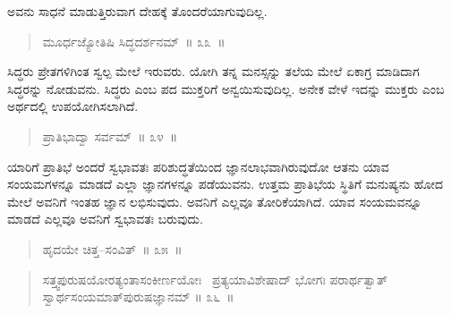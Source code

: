 
\vspace{0.1cm}

ಅವನು ಸಾಧನೆ ಮಾಡುತ್ತಿರುವಾಗ ದೇಹಕ್ಕೆ ತೊಂದರೆಯಾಗುವುದಿಲ್ಲ. 

\vspace{-0.2cm}

\begin{verse}
ಮೂರ್ಧಜ್ಯೋತಿಷಿ ಸಿದ್ಧದರ್ಶನಮ್​~॥ ೩೩~॥
\end{verse}

\vspace{-0.4cm}


\vspace{0.1cm}

ಸಿದ್ಧರು ಪ್ರೇತಗಳಿಗಿಂತ ಸ್ವಲ್ಪ ಮೇಲೆ ಇರುವರು. ಯೋಗಿ ತನ್ನ ಮನಸ್ಸನ್ನು ತಲೆಯ ಮೇಲೆ ಏಕಾಗ್ರ ಮಾಡಿದಾಗ ಸಿದ್ಧರನ್ನು ನೋಡುವನು. ಸಿದ್ಧರು ಎಂಬ ಪದ ಮುಕ್ತರಿಗೆ ಅನ್ವಯಿಸುವುದಿಲ್ಲ. ಅನೇಕ ವೇಳೆ ಇದನ್ನು ಮುಕ್ತರು ಎಂಬ ಅರ್ಥದಲ್ಲಿ ಉಪಯೋಗಿಸಲಾಗಿದೆ. 

\vspace{-0.2cm}

\begin{verse}
ಪ್ರಾತಿಭಾದ್ವಾ ಸರ್ವಮ್​~॥ ೩೪~॥
\end{verse}

\vspace{-0.4cm}


\vspace{0.1cm}

ಯಾರಿಗೆ ಪ್ರಾತಿಭೆ ಅಂದರೆ ಸ್ವಭಾವತಃ ಪರಿಶುದ್ಧತೆಯಿಂದ ಜ್ಞಾನಲಾಭವಾಗಿರುವುದೋ ಆತನು ಯಾವ ಸಂಯಮಗಳನ್ನೂ ಮಾಡದೆ ಎಲ್ಲಾ ಜ್ಞಾನಗಳನ್ನೂ ಪಡೆಯುವನು. ಉತ್ತಮ ಪ್ರಾತಿಭೆಯ ಸ್ಥಿತಿಗೆ ಮನುಷ್ಯನು ಹೋದ ಮೇಲೆ ಅವನಿಗೆ ಇಂತಹ ಜ್ಞಾನ ಲಭಿಸುವುದು. ಅವನಿಗೆ ಎಲ್ಲವೂ ತೋರಿಕೆಯಾಗಿದೆ. ಯಾವ ಸಂಯಮವನ್ನೂ ಮಾಡದೆ ಎಲ್ಲವೂ ಅವನಿಗೆ ಸ್ವಭಾವತಃ ಬರುವುದು. 

\vspace{-0.2cm}

\begin{verse}
ಹೃದಯೇ ಚಿತ್ತ–ಸಂವಿತ್​~॥ ೩೫~॥
\end{verse}

\vspace{-0.4cm}


\vspace{-0.2cm}

\begin{verse}
ಸತ್ತ್ವಪುರುಷಯೋರತ್ಯಂತಾಸಂಕೀರ್ಣಯೋಃ~ ಪ್ರತ್ಯಯಾವಿಶೇಷಾದ್​ ಭೋಗಃ ಪರಾರ್ಥತ್ವಾತ್​ ಸ್ವಾರ್ಥಸಂಯಮಾತ್​ ಪುರುಷಜ್ಞಾನಮ್ \hfill{॥ ೩೬~॥}
\end{verse}

